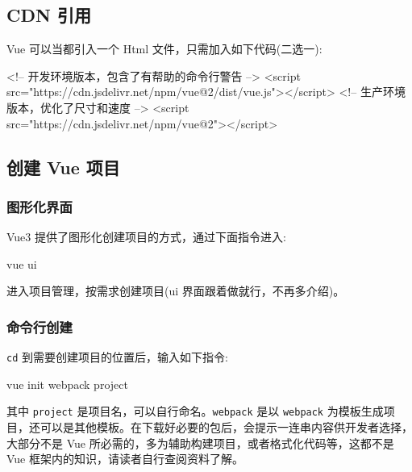 \subsection{CDN 引用}
Vue 可以当都引入一个 Html 文件，只需加入如下代码(二选一):
\begin{HTML}
<!-- 开发环境版本，包含了有帮助的命令行警告 -->
<script src="https://cdn.jsdelivr.net/npm/vue@2/dist/vue.js"></script>
<!-- 生产环境版本，优化了尺寸和速度 -->
<script src="https://cdn.jsdelivr.net/npm/vue@2"></script>
\end{HTML}

\subsection{创建 Vue 项目}
\subsubsection{图形化界面}

Vue3 提供了图形化创建项目的方式，通过下面指令进入:

\begin{bash}
vue ui
\end{bash}

进入项目管理，按需求创建项目(ui 界面跟着做就行，不再多介绍)。

\subsubsection{命令行创建}

\texttt{cd} 到需要创建项目的位置后，输入如下指令:
\begin{bash}
vue init webpack project
\end{bash}

其中 \texttt{project} 是项目名，可以自行命名。\texttt{webpack} 是以 \texttt{webpack} 为模板生成项目，还可以是其他模板。在下载好必要的包后，会提示一连串内容供开发者选择，大部分不是 Vue 所必需的，多为辅助构建项目，或者格式化代码等，这都不是 Vue 框架内的知识，请读者自行查阅资料了解。
\newpage